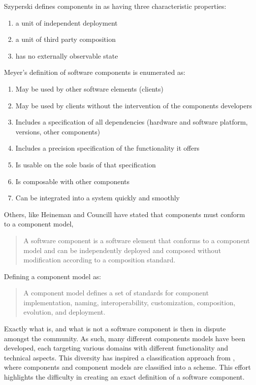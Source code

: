 Szyperski defines components in \cite{Szyperski2002} as having three characteristic properties:
\begin{enumerate}
  \item a unit of independent deployment
  \item a unit of third party composition
  \item has no externally observable state
\end{enumerate}

Meyer's definition of software components is enumerated as:
\begin{enumerate}
  \item May be used by other software elements (clients)
  \item May be used by clients without the intervention of the components
  developers
  \item Includes a specification of all dependencies (hardware and software
  platform, versions, other components)
  \item Includes a precision specification of the functionality it offers
  \item Is usable on the sole basis of that specification
  \item Is composable with other components
  \item Can be integrated into a system quickly and smoothly
\end{enumerate}

Others, like Heineman and Councill \cite{heineman2001component} have stated that components must conform to a component model, 
\begin{quotation}
A software component is a software element that conforms to a component model and can be independently deployed and composed without modification according to a composition standard.
\end{quotation}

Defining a component model as:
\begin{quotation}
A component model defines a set of standards for component implementation, naming, interoperability, customization, composition, evolution, and deployment.
\end{quotation}

Exactly what is, and what is not a software component is then in dispute amongst the community.
As such, many different components models have been developed, each targeting various domains with different functionality and technical aspects.
This diversity has inspired a classification approach from \cite{Crnkovic2011}, where components and component models are classified into a scheme.
This effort highlights the difficulty in creating an exact definition of a software component. 

